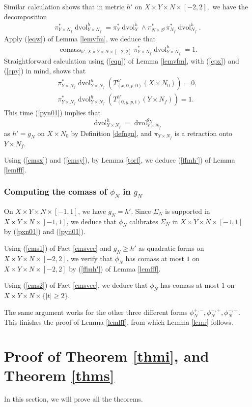\documentclass[11pt,a4paper]{amsart}
\numberwithin{equation}{section}
\newcommand{\Si}{\Sigma}
\newcommand{\cms}{\operatorname{comass}}
\newcommand{\dvol}{\operatorname{dvol}}
\newcommand{\du}{^\ast}
\newcommand{\pyn}{\pi_{Y\times N_f}}
\newcommand{\dvy}{\dvol_{Y\times N_f}^{g_N}}
\newcommand{\w}{\wedge}
\theoremstyle{plain}
\theoremstyle{definition}
\numberwithin{equation}{subsection}
\begin{document}
Similar calculation shows that in metric $h'$ on $X\times Y\times N\times[-2,2],$ we have the decomposition
\begin{align*}
	\pyn\du\dvol_{Y\times N_f}^h=\pi_Y\du\dvol_{Y}^h\w\pi\du_{N\times S^1}\pi_{N_f}\du\dvol_{N_f}^h.
\end{align*}
Apply (\ref{eqw}) of Lemma \ref{lemvfm}, we deduce that
\begin{align}\label{cmsy}
	\cms_{h',X\times Y\times N\times[-2,2]}	\pyn\du\dvol_{Y\times N_f}^h=1.
\end{align}
Straightforward calculation using (\ref{eqn})  of Lemma \ref{lemvfm}, with (\ref{cpx}) and (\ref{cpy}) in mind, shows that 
\begin{align}
	\pyn\du\dvol^h_{Y\times N_f}(T^{h'}_{(x,0,p,0)}(X\times N_0))=0,\\
\label{pyn01}	\pyn\du\dvol^h_{Y\times N_f}(T^{h'}_{(0,y,p,t)}(Y\times N_f))=1.
\end{align} 
This time (\ref{pyn01}) implies that $$\dvol^h_{Y\times N_f}=\dvy$$ as $h'=g_N$ on $X\times N_0$ by Definition \ref{defngn}, and $\pyn$ is a retraction onto $Y\times N_f.$

Using (\ref{cmsx}) and (\ref{cmsy}), by Lemma \ref{torf}, we deduce (\ref{ffmh'}) of Lemma \ref{lemfff}.
\subsubsection{Computing the comass of $\phi_N$ in $g_N$}
On $X\times Y\times N\times[-1,1]$, we have $g_N=h'.$ Since $\Si_N$ is supported in $X\times Y\times N\times[-1,1]$, we deduce that $\phi_N$ calibrates $\Si_N$ in $X\times Y\times N\times[-1,1]$ by (\ref{pxn01}) and (\ref{pyn01}).

Using (\ref{cms1}) of Fact \ref{cmsvec} and $g_N\ge h'$ as quadratic forms on $X\times Y\times N\times [-2,2].$ we verify that $\phi_N$ has comass at most $1$ on $X\times Y\times N\times [-2,2]$ by (\ref{ffmh'}) of Lemma \ref{lemfff}.

Using (\ref{cms2}) of Fact \ref{cmsvec}, we deduce that $\phi_N$ has comass at most $1$ on $X\times Y\times N\times \{|t|\ge 2\}.$

The same argument works for the other three different forms $\phi_N^{+,-},\phi_N^{-,+},\phi_N^{-,-}.$ This finishes the proof of Lemma \ref{lemfff}, from which Lemma \ref{lemr} follows.
\section{Proof of Theorem \ref{thmi}, and Theorem \ref{thms}}\label{secpfmt}
In this section, we will prove all the theorems.
\end{document}
